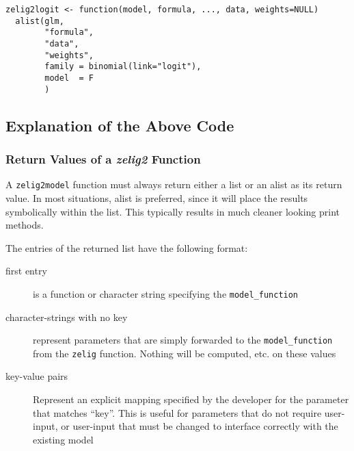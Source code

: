\documentclass[11pt]{article}
\begin{document}
\begin{verbatim}
zelig2logit <- function(model, formula, ..., data, weights=NULL)
  alist(glm,
        "formula",
        "data",
        "weights",
        family = binomial(link="logit"),
        model  = F
        )
\end{verbatim}


\subsection{Explanation of the Above Code}

\subsubsection{Return Values of a \emph{zelig2} Function}

A {\tt zelig2model} function must always return either a list or an alist as its return value.  In most situations, alist is preferred, since it will place the results symbolically within the list.  This typically results in much cleaner looking print methods.

The entries of the returned list have the following format:
\begin{description}
	\item[first entry]{is a function or character string specifying the {\tt model\_function}}
	\item[character-strings with no key]{represent parameters that are simply forwarded to the {\tt model\_function} from the {\tt zelig} function.  Nothing will be computed, etc. on these values}
	\item[key-value pairs]{Represent an explicit mapping specified by the developer for the parameter that matches ``key''.  This is useful for parameters that do not require user-input, or user-input that must be changed to interface correctly with the existing model}
\end{description}
\end{document}
